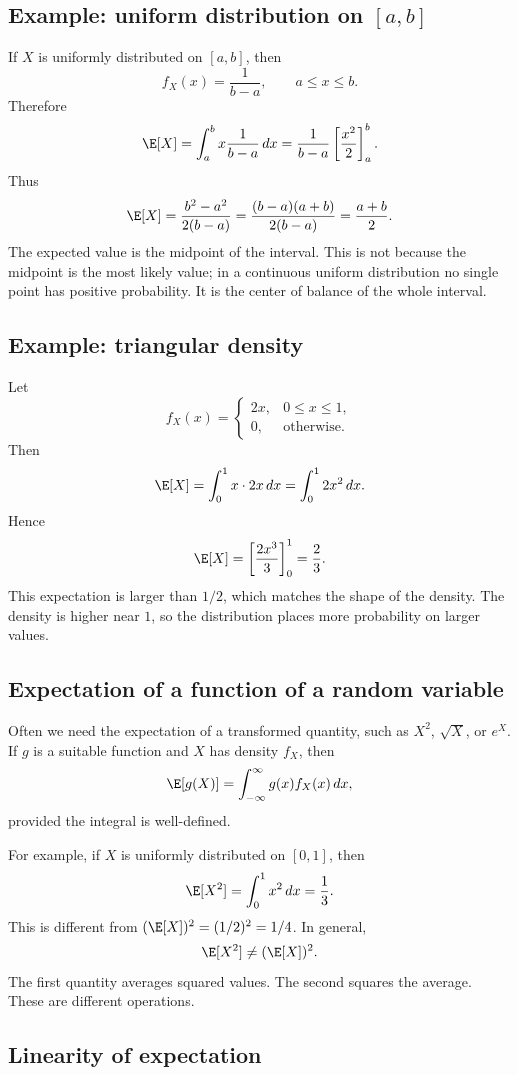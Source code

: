 \subsection*{Example: uniform distribution on \([a,b]\)}

If \(X\) is uniformly distributed on \([a,b]\), then
\[
f_X(x)=\frac1{b-a},\qquad a\leq x\leq b.
\]
Therefore
\[
\E[X]=\int_a^b x\frac1{b-a}\,dx
=\frac1{b-a}\left[\frac{x^2}{2}\right]_a^b.
\]
Thus
\[
\E[X]=\frac{b^2-a^2}{2(b-a)}=\frac{(b-a)(a+b)}{2(b-a)}=\frac{a+b}{2}.
\]
The expected value is the midpoint of the interval. This is not because the
midpoint is the most likely value; in a continuous uniform distribution no single
point has positive probability. It is the center of balance of the whole
interval.

\subsection*{Example: triangular density}

Let
\[
f_X(x)=
\begin{cases}
2x, & 0\leq x\leq1,\\
0, & \text{otherwise}.
\end{cases}
\]
Then
\[
\E[X]=\int_0^1 x\cdot 2x\,dx=\int_0^1 2x^2\,dx.
\]
Hence
\[
\E[X]=\left[\frac{2x^3}{3}\right]_0^1=\frac23.
\]
This expectation is larger than \(1/2\), which matches the shape of the density.
The density is higher near \(1\), so the distribution places more probability on
larger values.

\subsection*{Expectation of a function of a random variable}

Often we need the expectation of a transformed quantity, such as \(X^2\),
\(\sqrt X\), or \(e^X\). If \(g\) is a suitable function and \(X\) has density
\(f_X\), then
\[
\E[g(X)]=\int_{-\infty}^{\infty}g(x)f_X(x)\,dx,
\]
provided the integral is well-defined.

For example, if \(X\) is uniformly distributed on \([0,1]\), then
\[
\E[X^2]=\int_0^1 x^2\,dx=\frac13.
\]
This is different from \((\E[X])^2=(1/2)^2=1/4\). In general,
\[
\E[X^2]\neq (\E[X])^2.
\]
The first quantity averages squared values. The second squares the average.
These are different operations.

\subsection*{Linearity of expectation}

